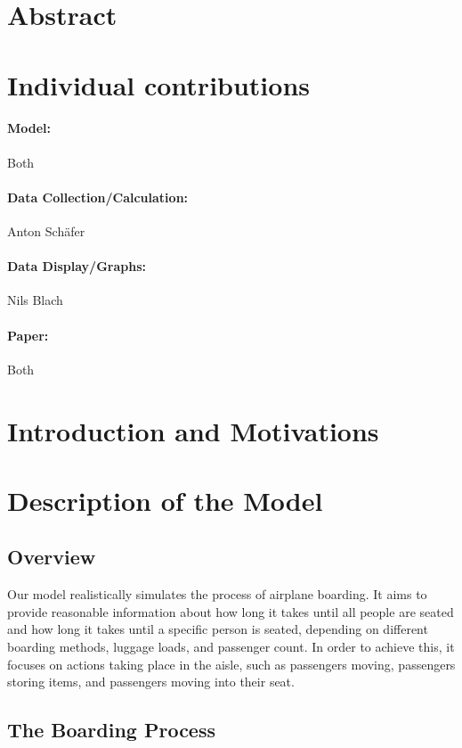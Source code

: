 \documentclass[11pt]{article}
\begin{document}
\section{Abstract}

\section{Individual contributions}
\paragraph{Model:} Both
\paragraph{Data Collection/Calculation:} Anton Sch{\"a}fer
\paragraph{Data Display/Graphs:} Nils Blach
\paragraph{Paper:} Both

\section{Introduction and Motivations}

\section{Description of the Model}

\subsection{Overview}

Our model realistically simulates the process of airplane boarding. It aims to provide reasonable information about how long it takes until all people are seated and how long it takes until a specific person is seated, depending on different boarding methods, luggage loads, and passenger count.  In order to achieve this, it focuses on actions taking place in the aisle, such as passengers moving, passengers storing items, and passengers moving into their seat.


\subsection{The Boarding Process}
\end{document}
